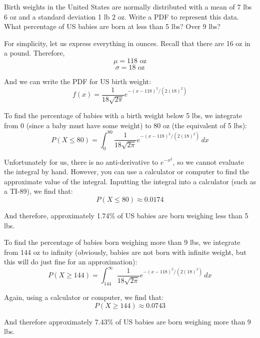 \begin{Worked}
\begin{Problem}
Birth weights in the United States are normally distributed 
with a mean of 7 lbs 6 oz and a standard deviation 1 lb 2 oz. Write a PDF to 
represent this data. What percentage of US babies are born at less than 5 lbs? 
Over 9 lbs?
\end{Problem}
\begin{Solution}
For simplicity, let us express everything in ounces. Recall 
that there are 16 oz in a pound. Therefore, 
$$\mu = 118\text{ oz}$$
$$\sigma = 18\text{ oz}$$

And we can write the PDF for US birth weight:
$$f(x) = \frac{1}{18\sqrt{2\pi}}e^{-\left(x - 118 \right)^2/\left(2 \left( 18 
\right)^2 \right)}$$

To find the percentage of babies with a birth weight below 5 lbs, we integrate 
from 0 (since a baby must have some weight) to 80 oz (the equivalent of 5 lbs):
$$P(X \leq 80) = \int_0^{80} \frac{1}{18\sqrt{2\pi}}e^{-\left(x - 118 \right)^2/
\left(2 \left( 18 \right)^2 \right)}\,dx$$

Unfortunately for us, there is no anti-derivative to $e^{-x^2}$, so we cannot 
evaluate the integral by hand. However, you can use a calculator or computer 
to find the approximate value of the integral. Inputting the integral into a 
calculator (such as a TI-89), we find that:
$$P(X \leq 80) \approx 0.0174$$

And therefore, approximately 1.74\% of US babies are born weighing less than 5 
lbs. 

To find the percentage of babies born weighing more than 9 lbs, we integrate 
from 144 oz to infinity (obviously, babies are not born with infinite weight, 
but this will do just fine for an approximation):
$$P(X \geq 144) = \int_{144}^{\infty} \frac{1}{18\sqrt{2\pi}}e^{-\left(x - 118 
\right)^2/\left(2 \left( 18 \right)^2 \right)}\,dx$$

Again, using a calculator or computer, we find that:
$$P(X \geq 144) \approx 0.0743$$

And therefore approximately 7.43\% of US babies are born weighing more than 9 
lbs.
\end{Solution}
\end{Worked}
